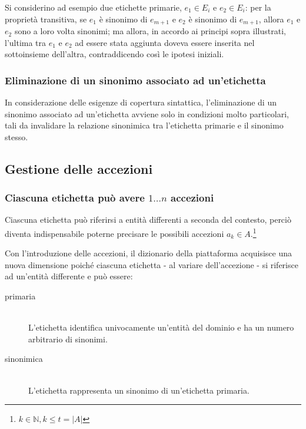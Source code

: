 \documentclass[10pt,a4paper,headinclude,footinclude,hidelinks]{scrreprt} %
\begin{document}
	Si considerino ad esempio due etichette primarie, $e_1 \in E_i$ e $e_2 \in E_i$: per la proprietà transitiva, se $e_1$ è sinonimo di $e_{m+1}$ e $e_2$ è sinonimo di $e_{m+1}$, allora $e_1$ e $e_2$ sono a loro volta sinonimi; ma allora, in accordo ai principi sopra illustrati, l'ultima tra $e_1$ e $e_2$ ad essere stata aggiunta doveva essere inserita nel sottoinsieme dell'altra, contraddicendo così le ipotesi iniziali.

	\subsubsection{Eliminazione di un sinonimo associato ad un'etichetta}
	In considerazione delle esigenze di copertura sintattica, l'eliminazione di un sinonimo associato ad un'etichetta avviene solo in condizioni molto particolari, tali da invalidare la relazione sinonimica tra l'etichetta primarie e il sinonimo stesso.

	\subsection{Gestione delle accezioni}
	\label{sec:stage:requisiti:etichette:accezioni}
	\subsubsection{Ciascuna etichetta può avere $1\ldots n$ accezioni}
	Ciascuna etichetta può riferirsi a entità differenti a seconda del contesto, perciò diventa indispensabile poterne precisare le possibili accezioni $a_k \in A$.\footnote{$k \in \mathbb{N}, k \leq t=\left|A\right|$}
	
	Con l'introduzione delle accezioni, il dizionario della piattaforma acquisisce una nuova dimensione poiché ciascuna etichetta - al variare dell'accezione - si riferisce ad un'entità differente e può essere:
	\begin{description}
	\item[primaria] \hfill \\
	L'etichetta identifica univocamente un'entità del dominio e ha un numero arbitrario di sinonimi.
	\item[sinonimica] \hfill \\
	L'etichetta rappresenta un sinonimo di un'etichetta primaria.
	\end{description}
\end{document}
